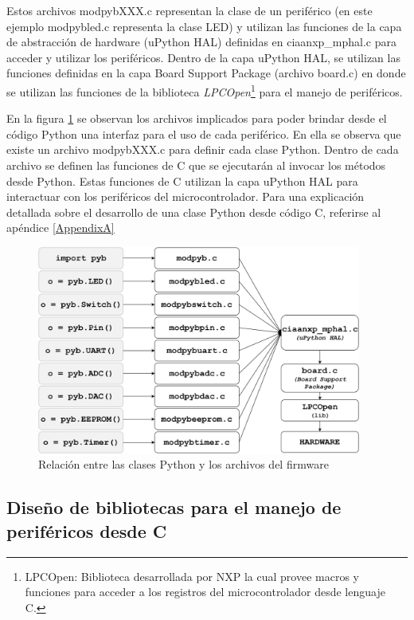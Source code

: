 Estos archivos modpybXXX.c representan la clase de un periférico (en este ejemplo modpybled.c representa la clase LED) y utilizan las funciones de la capa de abstracción de hardware (uPython HAL) definidas en ciaanxp\_mphal.c para acceder y utilizar los periféricos.
Dentro de la capa uPython HAL, se utilizan las funciones definidas en la capa Board Support Package (archivo board.c) en donde se utilizan las funciones de la biblioteca \textit{LPCOpen}\footnote{LPCOpen: Biblioteca desarrollada por NXP la cual provee macros y funciones para acceder a los registros del microcontrolador desde lenguaje C.} para el manejo de periféricos.

En la figura \ref{fig:files} se observan los archivos implicados para poder brindar desde el código Python una interfaz para el uso de cada periférico. En ella se observa que existe un archivo modpybXXX.c para definir cada clase Python. Dentro de cada archivo se definen las funciones de C que se ejecutarán al invocar los métodos desde Python. Estas funciones de C utilizan la capa uPython HAL para interactuar con los periféricos del microcontrolador.
Para una explicación detallada sobre el desarrollo de una clase Python desde código C, referirse al apéndice \ref{AppendixA}

\begin{figure}[ht]
  \centering
    \includegraphics[width=0.95\textwidth]{Figures/fig_files}
  \caption{Relación entre las clases Python y los archivos del firmware}
  \label{fig:files}
\end{figure}


\subsection{Diseño de bibliotecas para el manejo de periféricos desde C}

